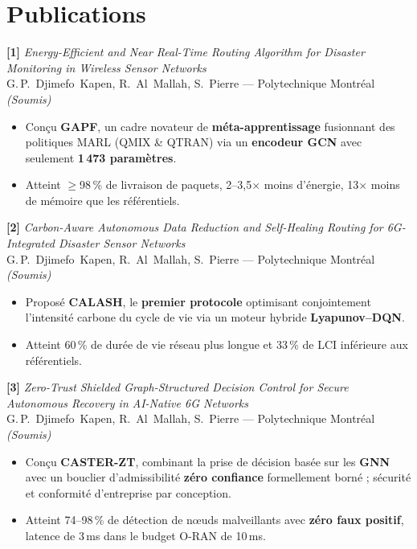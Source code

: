\documentclass[10pt,a4paper,sans]{moderncv}
\begin{document}
\section{Publications}

\textbf{[1]} \textit{Energy-Efficient and Near Real-Time Routing Algorithm for
Disaster Monitoring in Wireless Sensor Networks}\\
G.\,P.~Djimefo~Kapen, R.~Al~Mallah, S.~Pierre --- Polytechnique
Montréal \hfill \textit{(Soumis)}
\begin{itemize}[leftmargin=1.5em, topsep=2pt, itemsep=0pt, parsep=0pt]
  \item Conçu \textbf{GAPF}, un cadre novateur de \textbf{méta-apprentissage}
        fusionnant des politiques MARL (QMIX \& QTRAN) via un
        \textbf{encodeur GCN} avec seulement \textbf{1\,473 paramètres}.
  \item Atteint $\geq$98\,\% de livraison de paquets, 2--3,5$\times$ moins
        d'énergie, 13$\times$ moins de mémoire que les référentiels.
\end{itemize}

\vspace{0.4em}
\textbf{[2]} \textit{Carbon-Aware Autonomous Data Reduction and Self-Healing
Routing for 6G-Integrated Disaster Sensor Networks}\\
G.\,P.~Djimefo~Kapen, R.~Al~Mallah, S.~Pierre --- Polytechnique
Montréal \hfill \textit{(Soumis)}
\begin{itemize}[leftmargin=1.5em, topsep=2pt, itemsep=0pt, parsep=0pt]
  \item Proposé \textbf{CALASH}, le \textbf{premier protocole} optimisant
        conjointement l'intensité carbone du cycle de vie via un moteur
        hybride \textbf{Lyapunov--DQN}.
  \item Atteint 60\,\% de durée de vie réseau plus longue et 33\,\% de LCI
        inférieure aux référentiels.
\end{itemize}

\vspace{0.4em}
\textbf{[3]} \textit{Zero-Trust Shielded Graph-Structured Decision Control for
Secure Autonomous Recovery in AI-Native 6G Networks}\\
G.\,P.~Djimefo~Kapen, R.~Al~Mallah, S.~Pierre --- Polytechnique
Montréal \hfill \textit{(Soumis)}
\begin{itemize}[leftmargin=1.5em, topsep=2pt, itemsep=0pt, parsep=0pt]
  \item Conçu \textbf{CASTER-ZT}, combinant la prise de décision basée sur
        les \textbf{GNN} avec un bouclier d'admissibilité \textbf{zéro
        confiance} formellement borné ; sécurité et conformité d'entreprise
        par conception.
  \item Atteint 74--98\,\% de détection de nœuds malveillants avec
        \textbf{zéro faux positif}, latence de 3\,ms dans le budget
        O-RAN de 10\,ms.
\end{itemize}
\end{document}
